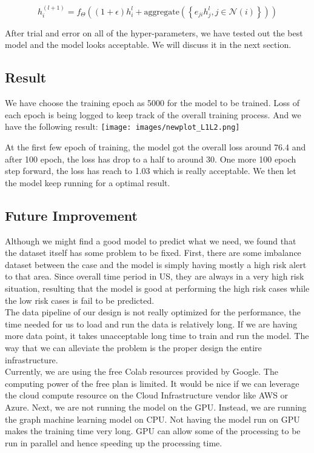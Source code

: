 \[h_i^{(l+1)} = f_\Theta \left((1 + \epsilon) h_i^{l} +
\mathrm{aggregate}\left(\left\{e_{ji} h_j^{l}, j\in\mathcal{N}(i)
\right\}\right)\right)\]

After trial and error on all of the hyper-parameters, we have tested out the best model and the model looks acceptable. We will discuss it in the next section.\\

\subsection{Result}

We have choose the training epoch as 5000 for the model to be trained. Loss of each epoch is being logged to keep track of the overall training process. And we have the following result: 
\texttt{[image: images/newplot\_L1L2.png]}

At the first few epoch of training, the model got the overall loss around 76.4 and after 100 epoch, the loss has drop to a half to around 30. One more 100 epoch step forward, the loss has reach to 1.03 which is really acceptable. We then let the model keep running for a optimal result.\\

\subsection{Future Improvement}
Although we might find a good model to predict what we need, we found that the dataset itself has some problem to be fixed. First, there are some imbalance dataset between the case and the model is simply having mostly a high risk alert to that area. Since overall time period in US, they are always in a very high risk situation, resulting that the model is good at performing the high risk cases while the low risk cases is fail to be predicted. \\

The data pipeline of our design is not really optimized for the performance, the time needed for us to load and run the data is relatively long. If we are having more data point, it takes unacceptable long time to train and run the model. The way that we can alleviate the problem is the proper design the entire infrastructure.\\

Currently, we are using the free Colab resources provided by Google. The computing power of the free plan is limited. It would be nice if we can leverage the cloud compute resource on the Cloud Infrastructure vendor like AWS or Azure. Next, we are not running the model on the GPU. Instead, we are running the graph machine learning model on CPU. Not having the model run on GPU makes the training time very long. GPU can allow some of the processing to be run in parallel and hence speeding up the processing time.\\

